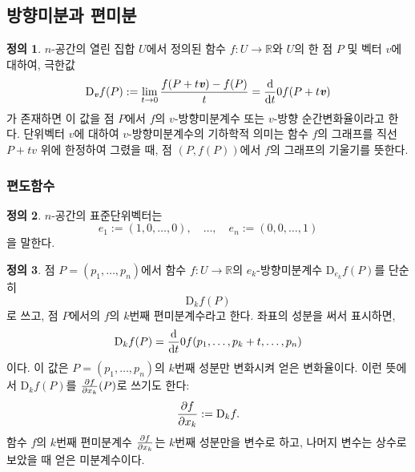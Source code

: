 \documentclass[unfonts,oneside,a4paper]{oblivoir}
\theoremstyle{definition}
\newtheorem{definition}{정의}[subsubsection]
\theoremstyle{theorem}
\renewcommand{\vec}[1]{\bm{\mathit{#1}}}
\newcommand{\dD}{\mathrm{D}}
\begin{document}
\subsection{방향미분과 편미분}

\begin{definition}
    $n$-공간의 열린 집합 $U$에서 정의된 함수 $f: U \rightarrow \mathbb R$와 $U$의 한 점 $P$ 및 벡터 $\vec v$에 대하여, 극한값
    \begin{equation*}
        \dD_{\vec v} f(P) := \lim_{t \rightarrow 0} \frac{f(P + t \vec v) - f(P)}{t} = \diff*{}{t}{0} f(P + t \vec v)
    \end{equation*}
    가 존재하면 이 값을 점 $P$에서 $f$의 $\vec v$-방향미분계수 또는 $\vec v$-방향 순간변화율이라고 한다.
    단위벡터 $\vec v$에 대하여 $\vec v$-방향미분계수의 기하학적 의미는 함수 $f$의 그래프를 직선 $P + t \vec v$ 위에 한정하여 그렸을 때, 점 $(P, f(P))$에서 $f$의 그래프의 기울기를 뜻한다.
\end{definition}

\subsubsection{편도함수}

\begin{definition}
    $n$-공간의 표준단위벡터는
    \begin{equation*}
        \vec e_1 := (1, 0, \dots, 0),\quad\dots,\quad\vec e_n := (0, 0, \dots, 1)
    \end{equation*}
    을 말한다.
\end{definition}

\begin{definition}
    점 $P = (p_1, \dots, p_n)$에서 함수 $f: U \rightarrow \mathbb R$의 $\vec e_k$-방향미분계수 $\dD_{\vec e_k} f(P)$를 단순히
    \begin{equation*}
        \dD_k f(P)
    \end{equation*}
    로 쓰고, 점 $P$에서의 $f$의 $k$번째 편미분계수라고 한다.
    좌표의 성분을 써서 표시하면,
    \begin{equation*}
        \dD_k f(P) = \diff*{}{t}{0} f(p_1, \dots, p_k + t, \dots, p_n)
    \end{equation*}
    이다.
    이 값은 $P = (p_1, \dots, p_n)$의 $k$번째 성분만 변화시켜 얻은 변화율이다.
    이런 뜻에서 $\dD_k f(P)$를 $\diffp{f}{x_k} (P)$로 쓰기도 한다:
    \begin{equation*}
        \diffp{f}{x_k} := \dD_k f.
    \end{equation*}
    함수 $f$의 $k$번째 편미분계수 $\diffp{f}{x_k}$는 $k$번째 성분만을 변수로 하고, 나머지 변수는 상수로 보았을 때 얻은 미분계수이다.
\end{definition}
\end{document}
